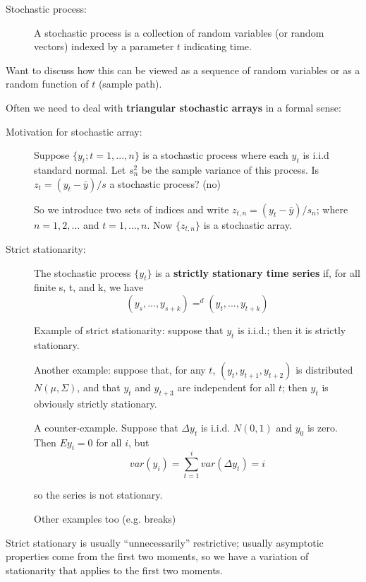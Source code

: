\begin{description}
\item[Stochastic process:]
A stochastic process is a collection of random variables (or
random vectors) indexed by a parameter $t$ indicating time.
\end{description}

Want to discuss how this can be viewed as a sequence of random
variables or as a random function of $t$ (sample path).

Often we need to deal with \textbf{triangular stochastic arrays} in a
formal sense:

\begin{description}
\item[Motivation for stochastic array:]
  Suppose $\{y_t; t=1,...,n\}$ is a stochastic process where each
  $y_t$ is i.i.d standard normal. Let $s^2_n$ be the sample variance
  of this process. Is $z_t = (y_t - \bar y) / s$ a stochastic process?
  (no)

  So we introduce two sets of indices and write $z_{t,n} = (y_t - \bar
  y) / s_n$; where $n = 1,2,...$ and $t = 1,...,n$.  Now $\{z_{t,n}\}$
  is a stochastic array.
\item[Strict stationarity:]
  The stochastic process $\{y_t\}$ is a \textbf{strictly stationary
    time series} if, for all finite s, t, and k, we have
  \[(y_s,...,y_{s+k}) =^d (y_t,...,y_{t+k})\]

  Example of strict stationarity: suppose that $y_t$ is i.i.d.; then
  it is strictly stationary.

  Another example: suppose that, for any $t$, $(y_t, y_{t+1},
  y_{t+2})$ is distributed $N(μ,Σ)$, and that $y_t$ and $y_{t+3}$ are
  independent for all $t$; then $y_t$ is obviously strictly
  stationary.

  A counter-example. Suppose that $Δy_t$ is i.i.d. $N(0,1)$ and $y_0$
  is zero. Then $E y_i = 0$ for all $i$, but
  \[var(y_i) = \sum_{t=1}^i var(Δy_t) = i\]

  so the series is not stationary.

  Other examples too (e.g. breaks)
\end{description}

Strict stationary is usually ``unnecessarily'' restrictive; usually
asymptotic properties come from the first two moments, so we have a
variation of stationarity that applies to the first two moments.

